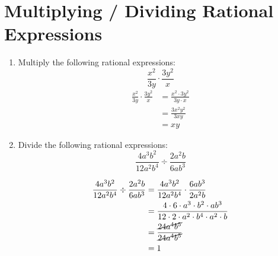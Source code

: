 \documentclass{article}
\begin{document}
\section*{Multiplying / Dividing Rational Expressions}
\begin{enumerate}[resume]
    \item Multiply the following rational expressions:
    \begin{equation*}
        \frac{x^2}{3y} \cdot \frac{3y^2}{x}
    \end{equation*}
    \begin{align*}
\frac{x^2}{3y} \cdot \frac{3y^2}{x} &= \frac{x^2 \cdot 3y^2}{3y \cdot x} \\
&= \frac{3x^2y^2}{3xy} \\
&= xy
\end{align*}

    \item Divide the following rational expressions:
    \begin{equation*}
        \frac{4a^3b^2}{12a^2b^4} \div \frac{2a^2b}{6ab^3}
    \end{equation*}

\begin{align*}
\frac{4a^3b^2}{12a^2b^4} \div \frac{2a^2b}{6ab^3} &= \frac{4a^3b^2}{12a^2b^4} \cdot \frac{6ab^3}{2a^2b} \\
&= \frac{4 \cdot 6 \cdot a^3 \cdot b^2 \cdot ab^3}{12 \cdot 2 \cdot a^2 \cdot b^4 \cdot a^2 \cdot b} \\
&= \frac{\cancel{24a^4b^5}}{\cancel{24a^4b^5}} \\
&= 1
\end{align*}

\end{enumerate}
\end{document}

